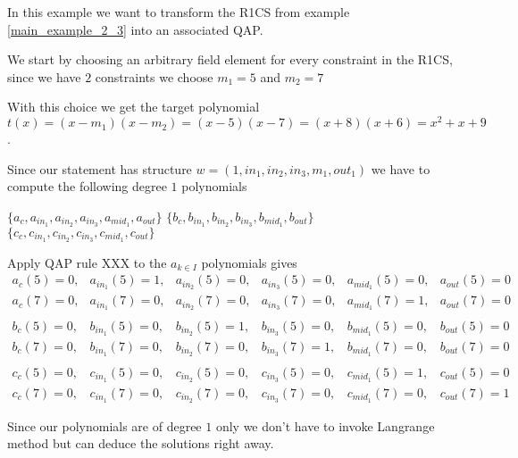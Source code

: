 \begin{example}
In this example we want to transform the R1CS from example \ref{main_example_2_3} into an associated QAP.

We start by choosing an arbitrary field element for every constraint in the R1CS, since we have $2$ constraints we choose $m_{1}=5$ and $m_{2}=7$

With this choice we get the target polynomial $t(x)=(x-m_1)(x-m_2)= (x-5)(x-7)= (x+8)(x+6)= x^2 + x +9$.

Since our statement has structure $w=(1, in_1,in_2,in_3,m_1,out_1)$ we have to compute the following degree $1$ polynomials

$\{a_{c},a_{in_{1}},a_{in_{2}},a_{in_{3}},a_{mid_{1}},a_{out}\}$
$\{b_{c},b_{in_{1}},b_{in_{2}},b_{in_{3}},b_{mid_{1}},b_{out}\}$
$\{c_{c},c_{in_{1}},c_{in_{2}},c_{in_{3}},c_{mid_{1}},c_{out}\}$

\item Apply QAP rule XXX to the $a_{k\in I}$ polynomials gives
$$
\begin{array}{llllll}
a_{c}(5)=0, & a_{in_{1}}(5)=1, & a_{in_{2}}(5)=0, & a_{in_{3}}(5)=0, & a_{mid_{1}}(5)=0, & a_{out}(5)=0 \\
a_{c}(7)=0, & a_{in_{1}}(7)=0, & a_{in_{2}}(7)=0, & a_{in_{3}}(7)=0, & a_{mid_{1}}(7)=1, & a_{out}(7)=0\\
\\
b_{c}(5)=0, & b_{in_{1}}(5)=0, & b_{in_{2}}(5)=1, & b_{in_{3}}(5)=0, & b_{mid_{1}}(5)=0, & b_{out}(5)=0 \\
b_{c}(7)=0, & b_{in_{1}}(7)=0, & b_{in_{2}}(7)=0, & b_{in_{3}}(7)=1, & b_{mid_{1}}(7)=0, & b_{out}(7)=0\\
\\
c_{c}(5)=0, & c_{in_{1}}(5)=0, & c_{in_{2}}(5)=0, & c_{in_{3}}(5)=0, & c_{mid_{1}}(5)=1, & c_{out}(5)=0 \\
c_{c}(7)=0, & c_{in_{1}}(7)=0, & c_{in_{2}}(7)=0, & c_{in_{3}}(7)=0, & c_{mid_{1}}(7)=0, & c_{out}(7)=1
\end{array}
$$

Since our polynomials are of degree $1$ only we don't have to invoke Langrange method but can deduce the solutions right away. 


\end{example}
